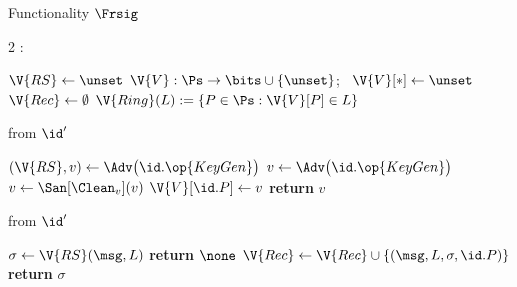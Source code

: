 \begin{interface}[nofloat]{Functionality $\Frsig$ \\
}

{\scriptsize
\setlength{\columnsep}{1.4em}
\begin{multicols}{2}
:
\begin{algorithmic}[1]
\setcounter{contline}{0}\algcont
\State $\V{RS} \gets \unset$
\State $\V{V} : \Ps \to \bits \cup \{\unset\}$; \ $\V{V}[*] \gets \unset$
\State $\V{Rec} \gets \emptyset$
\State $\V{Ring}(L) := \{P \in \Ps : \V{V}[P] \in L\}$
\algsave
\end{algorithmic}
\vspace{1.4ex}

 \quad from $\id'$
\begin{algorithmic}[1]
\algcont
{} \label{ln:rsigonce}
  \State $(\V{RS}, v) \gets \Adv\bigl(\id.\op{KeyGen}\bigr)$ \label{ln:rsigfirst}
\EndIf
{}
  \State $v \gets \Adv\bigl(\id.\op{KeyGen}\bigr)$
\EndIf
\State $v \gets \San[\Clean_{v}](v)$ \label{ln:rsigsan}
\State $\V{V}[\id.P] \gets v$
\State \textbf{return} $v$
\algsave
\end{algorithmic}
\vspace{1.4ex}

 \quad from $\id'$
\begin{algorithmic}[1]
\algcont
{} \label{ln:rsigreg}
\State $\sigma \gets \V{RS}(\msg, L)$ \label{ln:rsignoadv}
  \State \textbf{return} $\none$
\EndIf
\State $\V{Rec} \gets \V{Rec} \cup \{(\msg, L, \sigma, \id.P)\}$
\State \textbf{return} $\sigma$
\algsave
\end{algorithmic}
\vspace{1.4ex}

\columnbreak


\end{multicols}}
\end{interface}
